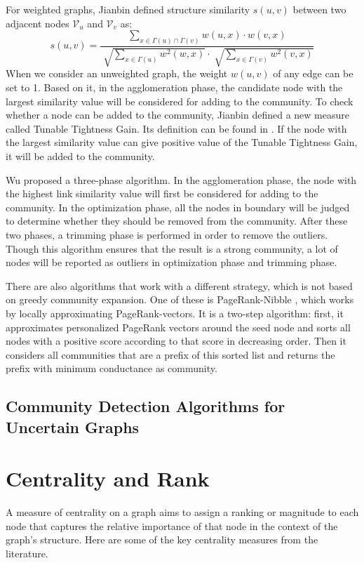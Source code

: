\documentclass[\main/thesis.tex]{subfiles}
\begin{document}
For weighted graphs, Jianbin \cite{huang2011towards} defined structure similarity $s(u,v)$ between two adjacent nodes $\mathcal{V}_u$ and $\mathcal{V}_v$ as:
\begin{equation}
s(u,v)=\frac{\sum_{x\in \Gamma(u)\cap\Gamma(v)}w(u,x)\cdot w(v,x)}{\sqrt[]{\sum_{x\in \Gamma(u)}w^2(w,x)}\cdot\sqrt[]{\sum_{x\in \Gamma(v)}w^2(v,x)}}
\end{equation}
When we consider an unweighted graph, the weight $w(u,v)$ of any edge can be set to 1. Based on it, in the agglomeration phase, the candidate node with the largest similarity value will be considered for adding to the community. To check whether a node can be added to the community, Jianbin defined a new measure called Tunable Tightness Gain. Its definition can be found in \cite{huang2011towards}. If the node with the largest similarity value can give positive value of the Tunable Tightness Gain, it will be added to the community.

Wu \cite{wu2012local} proposed a three-phase algorithm. In the agglomeration phase, the node with the highest link similarity value will first be considered for adding to the community. In the optimization phase, all the nodes in boundary will be judged to determine whether they should be removed from the community. After these two phases, a trimming phase is performed in order to remove the outliers. Though this algorithm ensures that the result is a strong community, a lot of nodes will be reported as outliers in optimization phase and trimming phase.

There are also algorithms that work with a different strategy, which is not based on greedy community expansion. One of these is PageRank-Nibble \cite{andersen2006local}, which works by locally approximating PageRank-vectors. It is a two-step algorithm: first, it approximates personalized PageRank vectors around the seed node and sorts all nodes with a positive score according to that score in decreasing order. Then it considers all communities that are a prefix of this sorted list and returns the prefix with minimum conductance as community.

\subsection{Community Detection Algorithms for Uncertain Graphs}

\section{Centrality and Rank}
A measure of centrality on a graph aims to assign a ranking or magnitude to each node that captures the relative importance of that node in the context of the graph’s structure. Here are some of the key centrality measures from the literature.
\end{document}
